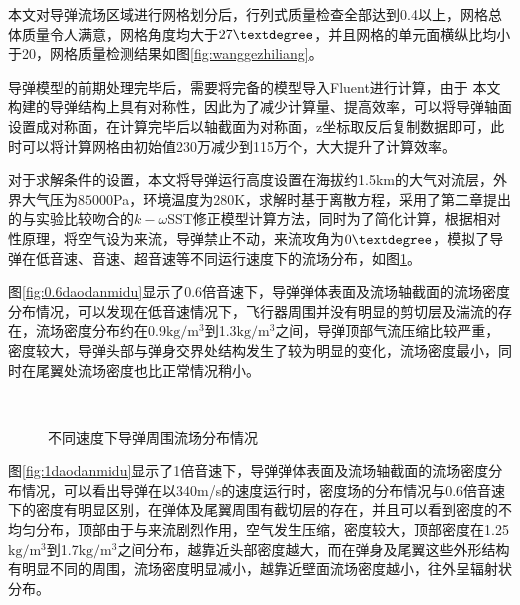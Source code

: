 本文对导弹流场区域进行网格划分后，行列式质量检查全部达到0.4以上，网格总体质量令人满意，网格角度均大于$27\textdegree$，并且网格的单元面横纵比均小于20，网格质量检测结果如图\ref{fig:wanggezhiliang}。

导弹模型的前期处理完毕后，需要将完备的模型导入Fluent进行计算，由于
本文构建的导弹结构上具有对称性，因此为了减少计算量、提高效率，可以将导弹轴面设置成对称面，在计算完毕后以轴截面为对称面，z坐标取反后复制数据即可，此时可以将计算网格由初始值230万减少到115万个，大大提升了计算效率。

对于求解条件的设置，本文将导弹运行高度设置在海拔约1.5km的大气对流层，外界大气压为$85000$Pa，环境温度为$280$K，求解时基于离散方程，采用了第二章提出的与实验比较吻合的$k-\omega$SST修正模型计算方法，同时为了简化计算，根据相对性原理，将空气设为来流，导弹禁止不动，来流攻角为$0\textdegree$，模拟了导弹在低音速、音速、超音速等不同运行速度下的流场分布，如图\ref{fig:daodanliuchang}。

图\ref{fig:0.6daodanmidu}显示了0.6倍音速下，导弹弹体表面及流场轴截面的流场密度分布情况，可以发现在低音速情况下，飞行器周围并没有明显的剪切层及湍流的存在，流场密度分布约在0.9$\text{kg}/\text{m}^3$到1.3$\text{kg}/\text{m}^3$之间，导弹顶部气流压缩比较严重，密度较大，导弹头部与弹身交界处结构发生了较为明显的变化，流场密度最小，同时在尾翼处流场密度也比正常情况稍小。

\begin{figure}[bhtp]
\centering
{}
\\
\caption{不同速度下导弹周围流场分布情况}
\label{fig:daodanliuchang}
\end{figure}

图\ref{fig:1daodanmidu}显示了1倍音速下，导弹弹体表面及流场轴截面的流场密度分布情况，可以看出导弹在以340m/s的速度运行时，密度场的分布情况与0.6倍音速下的密度有明显区别，在弹体及尾翼周围有截切层的存在，并且可以看到密度的不均匀分布，顶部由于与来流剧烈作用，空气发生压缩，密度较大，顶部密度在1.25$\text{kg}/\text{m}^3$到1.7$\text{kg}/\text{m}^3$之间分布，越靠近头部密度越大，而在弹身及尾翼这些外形结构有明显不同的周围，流场密度明显减小，越靠近壁面流场密度越小，往外呈辐射状分布。

